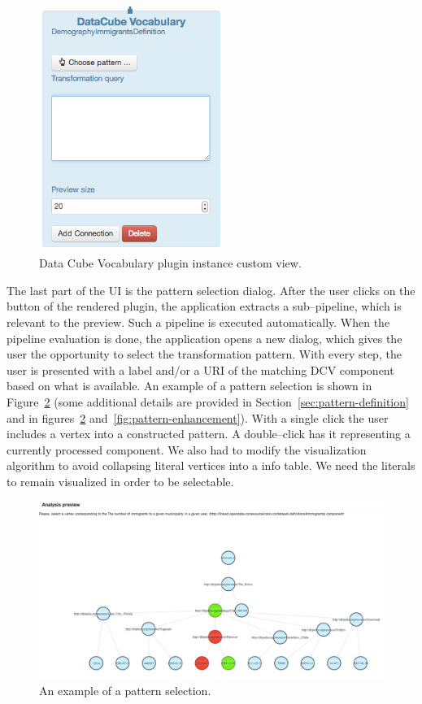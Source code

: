 \begin{figure}
	\centering
	\includegraphics[width=60mm]{img/custom-dcv-piv.png}
	\caption{Data Cube Vocabulary plugin instance custom view.}
	\label{fig:DCV-plugin-view}
\end{figure}

The last part of the UI is the pattern selection dialog. After the user clicks 
on the button of the rendered plugin, the application extracts a sub--pipeline, 
which is relevant to the preview. Such a pipeline is executed
automatically. When the pipeline evaluation is done, the application opens a new 
dialog, which gives the user the opportunity to select the transformation 
pattern. With every step, the user is presented with a label and/or a URI of the 
matching DCV component based on what is available. An example of a pattern 
selection is shown in Figure~\ref{fig:pattern-selection} (some additional details are provided
in Section~\ref{sec:pattern-definition}
and in figures~\ref{fig:pattern-selection} and~\ref{fig:pattern-enhancement}).
With a single click 
the user includes a vertex into a constructed pattern. A double--click 
has it representing a currently processed component. We also had to modify the 
visualization algorithm to avoid collapsing literal vertices into a info table. 
We need the literals to remain visualized in order to be selectable.

\begin{figure}
	\centering
	\includegraphics[width=140mm]{img/pattern-selection.png}
	\caption{An example of a pattern selection.}
	\label{fig:pattern-selection}
\end{figure}


